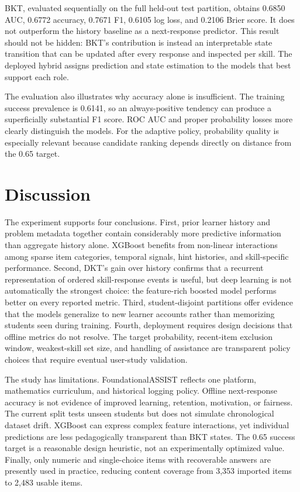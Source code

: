 \documentclass[conference]{IEEEtran}
\begin{document}
BKT, evaluated sequentially on the full held-out test partition, obtains 0.6850 AUC, 0.6772 accuracy, 0.7671 F1, 0.6105 log loss, and 0.2106 Brier score. It does not outperform the history baseline as a next-response predictor. This result should not be hidden: BKT's contribution is instead an interpretable state transition that can be updated after every response and inspected per skill. The deployed hybrid assigns prediction and state estimation to the models that best support each role.

The evaluation also illustrates why accuracy alone is insufficient. The training success prevalence is 0.6141, so an always-positive tendency can produce a superficially substantial F1 score. ROC AUC and proper probability losses more clearly distinguish the models. For the adaptive policy, probability quality is especially relevant because candidate ranking depends directly on distance from the 0.65 target.

\section{Discussion}
The experiment supports four conclusions. First, prior learner history and problem metadata together contain considerably more predictive information than aggregate history alone. XGBoost benefits from non-linear interactions among sparse item categories, temporal signals, hint histories, and skill-specific performance. Second, DKT's gain over history confirms that a recurrent representation of ordered skill-response events is useful, but deep learning is not automatically the strongest choice: the feature-rich boosted model performs better on every reported metric. Third, student-disjoint partitions offer evidence that the models generalize to new learner accounts rather than memorizing students seen during training. Fourth, deployment requires design decisions that offline metrics do not resolve. The target probability, recent-item exclusion window, weakest-skill set size, and handling of assistance are transparent policy choices that require eventual user-study validation.

The study has limitations. FoundationalASSIST reflects one platform, mathematics curriculum, and historical logging policy. Offline next-response accuracy is not evidence of improved learning, retention, motivation, or fairness. The current split tests unseen students but does not simulate chronological dataset drift. XGBoost can express complex feature interactions, yet individual predictions are less pedagogically transparent than BKT states. The 0.65 success target is a reasonable design heuristic, not an experimentally optimized value. Finally, only numeric and single-choice items with recoverable answers are presently used in practice, reducing content coverage from 3,353 imported items to 2,483 usable items.
\end{document}
